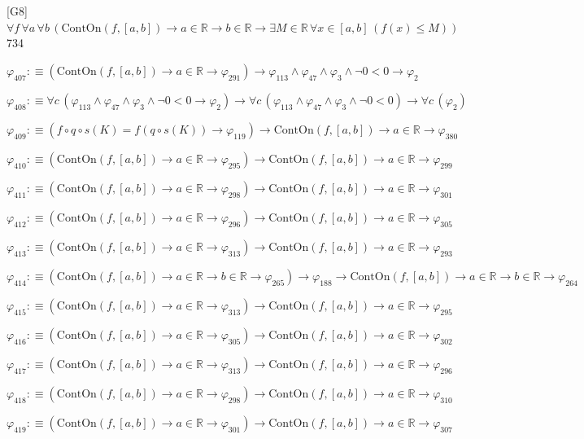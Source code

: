 \begin{fullproof}{[G8]}{$\forall f\,\forall a\,\forall b\,(\mathrm{ContOn}(f,[a,b]) \to a \in \mathbb{R} \to b \in \mathbb{R} \to \exists M \in \mathbb{R}\,\forall x \in [a,b]\,(f(x) \leq M))$}{734}
\begin{abbrevlist}
\item $\varphi_{407} :\equiv (\mathrm{ContOn}(f,[a,b]) \to a \in \mathbb{R} \to \varphi_{291}) \to \varphi_{113} \land \varphi_{47} \land \varphi_{3} \land \neg 0 < 0 \to \varphi_{2}$
\item $\varphi_{408} :\equiv \forall c\,(\varphi_{113} \land \varphi_{47} \land \varphi_{3} \land \neg 0 < 0 \to \varphi_{2}) \to \forall c\,(\varphi_{113} \land \varphi_{47} \land \varphi_{3} \land \neg 0 < 0) \to \forall c\,(\varphi_{2})$
\item $\varphi_{409} :\equiv (f \circ q \circ s(K) = f(q \circ s(K)) \to \varphi_{119}) \to \mathrm{ContOn}(f,[a,b]) \to a \in \mathbb{R} \to \varphi_{380}$
\item $\varphi_{410} :\equiv (\mathrm{ContOn}(f,[a,b]) \to a \in \mathbb{R} \to \varphi_{295}) \to \mathrm{ContOn}(f,[a,b]) \to a \in \mathbb{R} \to \varphi_{299}$
\item $\varphi_{411} :\equiv (\mathrm{ContOn}(f,[a,b]) \to a \in \mathbb{R} \to \varphi_{298}) \to \mathrm{ContOn}(f,[a,b]) \to a \in \mathbb{R} \to \varphi_{301}$
\item $\varphi_{412} :\equiv (\mathrm{ContOn}(f,[a,b]) \to a \in \mathbb{R} \to \varphi_{296}) \to \mathrm{ContOn}(f,[a,b]) \to a \in \mathbb{R} \to \varphi_{305}$
\item $\varphi_{413} :\equiv (\mathrm{ContOn}(f,[a,b]) \to a \in \mathbb{R} \to \varphi_{313}) \to \mathrm{ContOn}(f,[a,b]) \to a \in \mathbb{R} \to \varphi_{293}$
\item $\varphi_{414} :\equiv (\mathrm{ContOn}(f,[a,b]) \to a \in \mathbb{R} \to b \in \mathbb{R} \to \varphi_{265}) \to \varphi_{188} \to \mathrm{ContOn}(f,[a,b]) \to a \in \mathbb{R} \to b \in \mathbb{R} \to \varphi_{264}$
\item $\varphi_{415} :\equiv (\mathrm{ContOn}(f,[a,b]) \to a \in \mathbb{R} \to \varphi_{313}) \to \mathrm{ContOn}(f,[a,b]) \to a \in \mathbb{R} \to \varphi_{295}$
\item $\varphi_{416} :\equiv (\mathrm{ContOn}(f,[a,b]) \to a \in \mathbb{R} \to \varphi_{305}) \to \mathrm{ContOn}(f,[a,b]) \to a \in \mathbb{R} \to \varphi_{302}$
\item $\varphi_{417} :\equiv (\mathrm{ContOn}(f,[a,b]) \to a \in \mathbb{R} \to \varphi_{313}) \to \mathrm{ContOn}(f,[a,b]) \to a \in \mathbb{R} \to \varphi_{296}$
\item $\varphi_{418} :\equiv (\mathrm{ContOn}(f,[a,b]) \to a \in \mathbb{R} \to \varphi_{298}) \to \mathrm{ContOn}(f,[a,b]) \to a \in \mathbb{R} \to \varphi_{310}$
\item $\varphi_{419} :\equiv (\mathrm{ContOn}(f,[a,b]) \to a \in \mathbb{R} \to \varphi_{301}) \to \mathrm{ContOn}(f,[a,b]) \to a \in \mathbb{R} \to \varphi_{307}$

\end{abbrevlist}
\end{fullproof}
